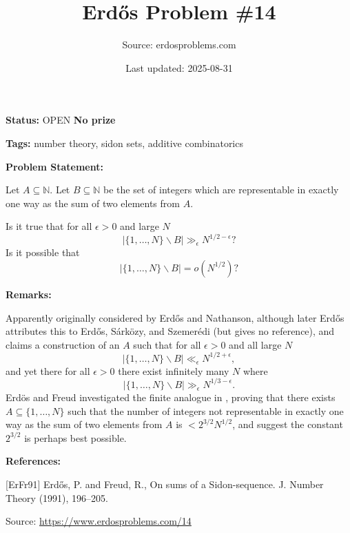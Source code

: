\documentclass{article}
\title{Erd\H{o}s Problem \#14}
\date{Last updated: 2025-08-31}
\author{Source: erdosproblems.com}
\begin{document}
\maketitle

\noindent\textbf{Status:} OPEN \quad \textbf{No prize}

\noindent\textbf{Tags:} number theory, sidon sets, additive combinatorics

\medskip
\noindent\textbf{Problem Statement:}

Let $A\subseteq \mathbb{N}$. Let $B\subseteq \mathbb{N}$ be the set of integers which are representable in exactly one way as the sum of two elements from $A$.

Is it true that for all $\epsilon>0$ and large $N$\[\lvert \{1,\ldots,N\}\backslash B\rvert \gg_\epsilon N^{1/2-\epsilon}?\]Is it possible that\[\lvert \{1,\ldots,N\}\backslash B\rvert =o(N^{1/2})?\]

\bigskip
\noindent\textbf{Remarks:}

Apparently originally considered by Erd\H{o}s and Nathanson, although later Erd\H{o}s attributes this to Erd\H{o}s, S\'{a}rk\"{o}zy, and Szemer\'{e}di (but gives no reference), and claims a construction of an $A$ such that for all $\epsilon>0$ and all large $N$\[\lvert \{1,\ldots,N\}\backslash B\rvert \ll_\epsilon N^{1/2+\epsilon},\]and yet there for all $\epsilon>0$ there exist infinitely many $N$ where\[\lvert \{1,\ldots,N\}\backslash B\rvert \gg_\epsilon N^{1/3-\epsilon}.\]Erd\"{o}s and Freud investigated the finite analogue in \cite{ErFr91}, proving that there exists $A\subseteq \{1,\ldots,N\}$ such that the number of integers not representable in exactly one way as the sum of two elements from $A$ is $<2^{3/2}N^{1/2}$, and suggest the constant $2^{3/2}$ is perhaps best possible.

\bigskip
\noindent\textbf{References:}

[ErFr91] Erd\H{o}s, P. and Freud, R., On sums of a Sidon-sequence. J. Number Theory (1991), 196--205.

\bigskip
\noindent\small{Source: \url{https://www.erdosproblems.com/14}}
\end{document}
